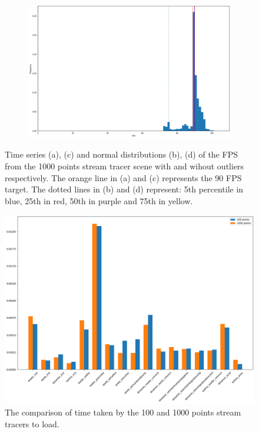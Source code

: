\begin{figure}[t]
\begin{subfigure}{.45\textwidth}
        \caption{}
    \end{subfigure}
    \begin{subfigure}{.45\textwidth}
        \centering
        \includegraphics[width=\textwidth]{pictures/analysis stream tracer 1000/output_14_0.png}
        \caption{}
    \end{subfigure}
    \caption{Time series (a), (c) and normal distributions (b), (d) of the FPS from the 1000 points stream tracer scene with and wihout outliers respectively. The orange line in (a) and (c) represents the 90 FPS target. The dotted lines in (b) and (d) represent: 5th percentile in blue, 25th in red, 50th in purple and 75th in yellow.}
    \label{fig:stream-tracer-1000-analysis}
\end{figure}

\begin{figure}
    \centering
    \includegraphics[width=.9\textwidth]{pictures/analysis stream tracer 1000/output_18_1.png}
    \caption{The comparison of time taken by the 100 and 1000 points stream tracers to load.}
    \label{fig:stream-tracer-1000-profiling}
\end{figure}
